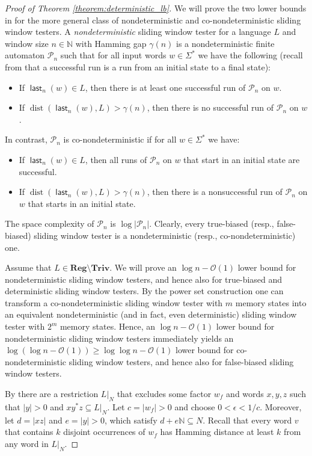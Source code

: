 \documentclass{article}\usepackage[a4paper,margin=20mm]{geometry}
\newcommand{\N}{\mathbb{N}}
\renewcommand{\O}{\mathcal{O}}
\renewcommand{\P}{\mathcal{P}}
\DeclareMathOperator{\last}{\mathsf{last}}
\DeclareMathOperator{\dist}{dist}
\newcommand{\Reg}{\mathbf{Reg}}
\newcommand{\Triv}{\mathbf{Triv}}
\renewcommand{\geq}{\geqslant}
\begin{document}
\begin{proof}[Proof of Theorem \ref{theorem:deterministic_lb}]
We will prove the two lower bounds in 
for the more general class of nondeterministic and co-nondeterministic sliding window testers.
A {\em nondeterministic} sliding window tester for a language $L$
and window size $n \in \N$ with Hamming gap $\gamma(n)$
is a nondeterministic finite automaton $\P_n$ such that for all input words $w \in \Sigma^*$ we have the following (recall from  that a successful
	run is a run from an initial state to a final state):
\begin{itemize}
	\item If $\last_n(w) \in L$, then there is at least one successful run of $\P_n$ on $w$.
	\item If $\dist(\last_n(w),L) > \gamma(n)$, then there is no successful run of $\P_n$ on $w$.
\end{itemize}
In contrast, $\P_n$ is co-nondeterministic if for all $w \in \Sigma^*$ we have:
\begin{itemize}
	\item If $\last_n(w) \in L$, then all runs of $\P_n$ on $w$ that start in an initial state are successful.
	\item If $\dist(\last_n(w),L) > \gamma(n)$, then there is a nonsuccessful run of $\P_n$ on $w$ that starts in an initial state.
\end{itemize}
The space complexity of $\P_n$ is $\log |\P_n|$.
Clearly, every true-biased (resp., false-biased) sliding window tester
is a nondeterministic (resp., co-nondeterministic) one.

Assume that $L \in \Reg\setminus\Triv$.
We will prove an $\log n - \O(1)$ lower bound for nondeterministic sliding window testers,
and hence also for true-biased and deterministic sliding window testers.
By the power set construction one can transform a co-nondeterministic sliding window tester
with $m$ memory states into an equivalent nondeterministic (and in fact, even deterministic) sliding window tester
with $2^m$ memory states. Hence, an $\log n - \O(1)$ lower bound for nondeterministic sliding window testers
immediately yields an $\log (\log n - \O(1)) \geq \log \log n - \O(1)$ lower bound
for co-nondeterministic sliding window testers,
and hence also for false-biased sliding window testers.

By  there 
are a restriction $L|_N$ that excludes some factor $w_f$ and words $x,y,z$ such that $|y|>0$ and 
$x y^* z \subseteq L|_N$. Let $c = |w_f| >0$ and choose $0 < \epsilon < 1/c$. Moreover,
let $d = |xz|$ and $e = |y|>0$, which satisfy $d+e\N \subseteq N$.
Recall that every word $v$ that contains $k$ disjoint occurrences of $w_f$ has Hamming distance
at least $k$ from any word in $L|_N$. 


\end{proof}
\end{document}
